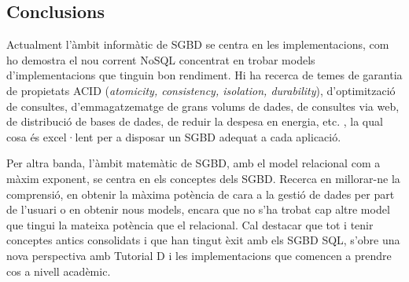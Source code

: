 


\subsection{Conclusions}


Actualment l'àmbit informàtic de SGBD se centra en les
implementacions, com ho demostra el nou corrent NoSQL concentrat en
trobar models d'implementacions que tinguin bon rendiment. Hi ha
recerca de temes de garantia de propietats ACID (\emph{atomicity,
  consistency, isolation, durability}), d'optimització de consultes,
d'emmagatzematge de grans volums de dades, de consultes via web, de
distribució de bases de dades, de reduir la despesa en energia,
etc. \parencite{stonebraker07,stonebraker10}, la qual cosa és
excel·lent per a disposar un SGBD adequat a cada aplicació.


Per altra banda, l'àmbit matemàtic de SGBD, amb el model relacional
com a màxim exponent, se centra en els conceptes dels SGBD. Recerca en
millorar-ne la comprensió, en obtenir la màxima potència de cara a la
gestió de dades per part de l'usuari o en obtenir nous models, encara
que no s'ha trobat cap altre model que tingui la mateixa potència que
el relacional. Cal destacar que tot i tenir conceptes antics
consolidats i que han tingut èxit amb els SGBD SQL, s'obre una nova
perspectiva amb Tutorial D i les implementacions que comencen a
prendre cos a nivell acadèmic.





















